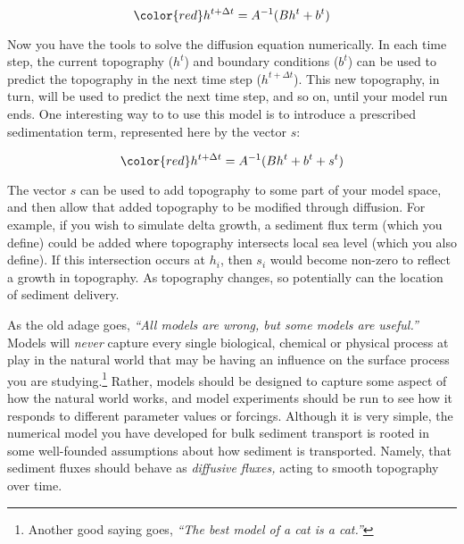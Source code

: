 \begin{equation*}
	{\color{red}h^{t+\Delta t} }
	=
	A^{-1}(Bh^{t}
	+
	b^{t})
\end{equation*}

\noindent Now you have the tools to solve the diffusion equation numerically. In each time step, the current topography ($h^t$) and boundary conditions ($b^t$) can be used to predict the topography in the next time step ($h^{t+\Delta t}$). This new topography, in turn, will be used to predict the next time step, and so on, until your model run ends. One interesting way to to use this model is to introduce a prescribed sedimentation term, represented here by the vector $s$:

\begin{equation*}
	{\color{red}h^{t+\Delta t} }
	=
	A^{-1}(Bh^{t}
	+
	b^{t}
	+
	s^{t})
\end{equation*}

\noindent The vector $s$ can be used to add topography to some part of your model space, and then allow that added topography to be modified through diffusion. For example, if you wish to simulate delta growth, a sediment flux term (which you define) could be added where topography intersects local sea level (which you also define). If this intersection occurs at $h_i$, then $s_i$ would become non-zero to reflect a growth in topography. As topography changes, so potentially can the location of sediment delivery.\\

\vspace{1em}

\noindent As the old adage goes, \textit{``All models are wrong, but some models are useful.''} Models will \emph{never} capture every single biological, chemical or physical process at play in the natural world that may be having an influence on the surface process you are studying.\footnote{Another good saying goes, \textit{``The best model of a cat is a cat.''}} Rather, models should be designed to capture some aspect of how the natural world works, and model experiments should be run to see how it responds to different parameter values or forcings. Although it is very simple, the numerical model you have developed for bulk sediment transport is rooted in some well-founded assumptions about how sediment is transported. Namely, that sediment fluxes should behave as \emph{diffusive fluxes,} acting to smooth topography over time.

\vspace{1em}

